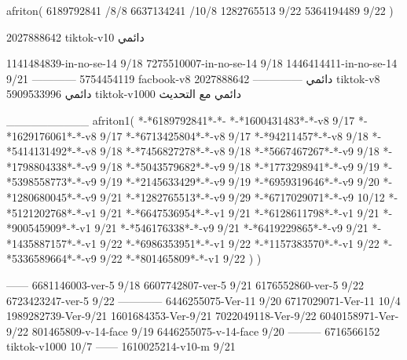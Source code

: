 afriton(
6189792841 /8/8
6637134241 /10/8
1282765513 9/22
5364194489 9/22
)

2027888642 tiktok-v10
دائمي



1141484839-in-no-se-14 9/18
7275510007-in-no-se-14 9/18
1446414411-in-no-se-14 9/21
------------
5754454119 facbook-v8
دائمي
--------------
2027888642 tiktok-v8
دائمي
5909533996 tiktok-v1000
دائمي مع التحديث

__________
afriton1(
*-*6189792841*-*-
*-*1600431483*-*-v8 9/17
*-*1629176061*-*-v8 9/17
*-*6713425804*-*-v8 9/17
*-*94211457*-*-v8 9/18
*-*5414131492*-*-v8 9/18
*-*7456827278*-*-v8 9/18
*-*5667467267*-*-v9 9/18
*-*1798804338*-*-v9 9/18
*-*5043579682*-*-v9 9/18
*-*1773298941*-*-v9 9/19
*-*5398558773*-*-v9 9/19
*-*2145633429*-*-v9 9/19
*-*6959319646*-*-v9 9/20
*-*1280680045*-*-v9 9/21
*-*1282765513*-*-v9 9/29
*-*6717029071*-*-v9 10/12
*-*5121202768*-*-v1 9/21
*-*6647536954*-*-v1 9/21
*-*6128611798*-*-v1 9/21
*-*900545909*-*-v1 9/21
*-*546176338*-*-v9 9/21
*-*6419229865*-*-v9 9/21
*-*1435887157*-*-v1 9/22
*-*6986353951*-*-v1 9/22
*-*1157383570*-*-v1 9/22
*-*5336589664*-*-v9 9/22
*-*801465809*-*-v1 9/22
)
)

------
6681146003-ver-5 9/18
6607742807-ver-5 9/21
6176552860-ver-5 9/22
6723423247-ver-5 9/22
------------
6446255075-Ver-11
9/20
6717029071-Ver-11
10/4
1989282739-Ver-9/21
1601684353-Ver-9/21
7022049118-Ver-9/22
6040158971-Ver-9/22
801465809-v-14-face 9/19
6446255075-v-14-face 9/20
---------
6716566152 tiktok-v1000
10/7
------
1610025214-v10-m 9/21
